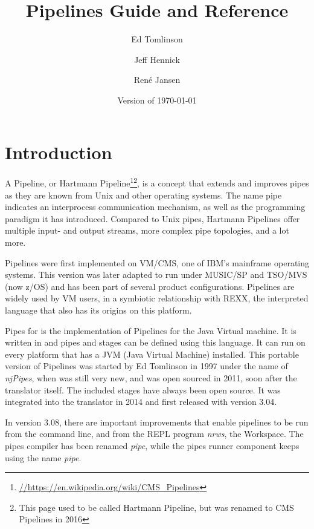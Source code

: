

\renewcommand{\isbn}{978-90-819090-3-7}    
\setcounter{tocdepth}{1} 
\title{Pipelines Guide and Reference}
\author{Ed Tomlinson \and Jeff Hennick \and René Jansen}
\date{\null\hfill Version  of \today}
\maketitle
{}
\pagestyle{plain}
\frontmatter
{}
\pagestyle{plain}

\tableofcontents
\newpage
{}
\frontmatter
\large

%
\mainmatter
\chapter{Introduction}
A Pipeline, or Hartmann
Pipeline\footnote{\url{//https://en.wikipedia.org/wiki/CMS_Pipelines}}\footnote{This
  page used to be called Hartmann Pipeline, but was renamed to CMS Pipelines
  in 2016}, is a concept that extends and improves pipes as they are known from Unix and other operating systems. The name pipe indicates an interprocess communication mechanism, as well as the programming paradigm it has introduced. Compared to Unix pipes, Hartmann Pipelines offer multiple input- and output streams, more complex pipe topologies, and a lot more.

Pipelines were first implemented on VM/CMS, one of IBM's mainframe
operating systems. This version was later adapted to run under
MUSIC/SP and TSO/MVS (now z/OS) and has been part of several product configurations. Pipelines are
widely used by VM users, in a symbiotic relationship with REXX, the
interpreted language that also has its origins on this platform.

Pipes for \nr{} is the implementation of Pipelines for the Java Virtual
machine. It is written in \nr{} and pipes and stages can be defined using this
language. It can run on every platform that has a JVM
(Java Virtual Machine) installed. This portable version of Pipelines was started
by Ed Tomlinson in 1997 under the name of \emph{njPipes}, when \nr{} was
still very new, and was open sourced in 2011, soon after the \nr{}
translator itself. The included stages have always been open source. It was integrated into the \nr{} translator in
2014 and first released with version 3.04.

In version 3.08, there are
important improvements that enable pipelines to be run from the
command line, and from the \nr{} REPL program \emph{nrws}, the
\nr{} Workspace. The pipes compiler has been renamed
\emph{pipc}, while the pipes runner component keeps using the name \emph{pipe}.

